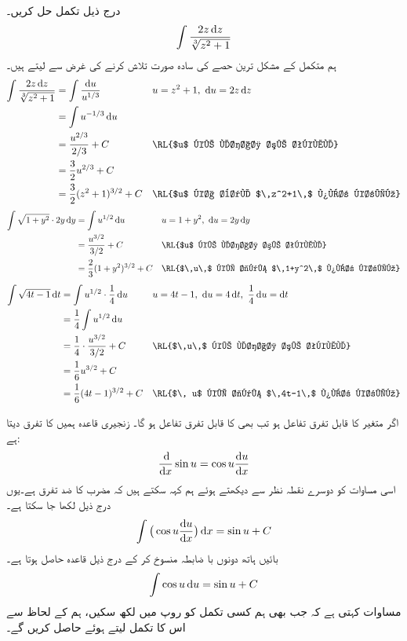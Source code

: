 درج ذیل تکمل حل کریں۔
\begin{align*}
\int\frac{2z\dif z}{\sqrt[3]{z^2+1}}
\end{align*}
ہم متکمل کے  مشکل ترین حصے کی سادہ صورت تلاش کرنے کی غرض سے   لیتے ہیں۔
\begin{align*}
\int\frac{2z\dif z}{\sqrt[3]{z^2+1}}&=\int\frac{\dif u}{u^{1/3}}&&u=z^2+1,\,\,\dif u=2z\dif z\\
&=\int u^{-1/3}\dif u\\
&=\frac{u^{2/3}}{2/3}+C&&\text{\RL{$u$ کے لحاظ سے تکمل}}\\
&=\frac{3}{2}u^{2/3}+C\\
&=\frac{3}{2}(z^2+1)^{3/2}+C&&\text{\RL{$u$ کا بدل $\,z^2+1\,$ پُر کریں}}
\end{align*}
\begin{align*}
\int\sqrt{1+y^2}\cdot 2y\dif y&=\int u^{1/2}\dif u&&u=1+y^2,\,\, \dif u=2y\dif y\\
&=\frac{u^{3/2}}{3/2}+C&&\text{\RL{$u$ کے لحاظ سے تکمل}}\\
&=\frac{2}{3}(1+y^2)^{3/2}+C&&\text{\RL{$\,u\,$ کی جگہ $\,1+y^2\,$ پُر کریں}}
\end{align*}
\begin{align*}
\int\sqrt{4t-1}\dif t&=\int u^{1/2}\cdot \frac{1}{4}\dif u&&u=4t-1,\,\,\dif u=4\dif t,\,\, \frac{1}{4}\dif u=\dif t\\
&=\frac{1}{4}\int u^{1/2}\dif u\\
&=\frac{1}{4}\cdot \frac{u^{3/2}}{3/2}+C&&\text{\RL{$\,u\,$ کے لحاظ سے تکمل}}\\
&=\frac{1}{6}u^{3/2}+C\\
&=\frac{1}{6}(4t-1)^{3/2}+C&&\text{\RL{$\, u$ کی جگہ $\,4t-1\,$ پُر کریں}}
\end{align*}

اگر  متغیر  کا قابل تفرق تفاعل ہو تب  بھی  کا قابل تفرق تفاعل ہو گا۔ زنجیری قاعدہ ہمیں  کا تفرق دیتا ہے:
\begin{align*}
\frac{\dif}{\dif x}\sin u=\cos u\frac{\dif u}{\dif x}
\end{align*}
اسی مساوات کو دوسرے نقطہ نظر سے دیکھتے ہوئے ہم کہہ سکتے ہیں کہ  مضرب  کا ضد تفرق ہے۔یوں درج ذیل لکھا جا سکتا ہے۔
\begin{align*}
\int\big(\cos u\frac{\dif u}{\dif x}\big)\dif x=\sin u+C
\end{align*}
بائیں ہاتھ دونوں   با ضابطہ  منسوخ  کر  کے درج ذیل قاعدہ حاصل ہوتا ہے۔
  \begin{align}\label{مساوات_تکمل_کوسائن_قاعدہ}
\int\cos u\dif u=\sin u+C
\end{align}
مساوات  کہتی ہے کہ جب بھی ہم کسی تکمل کو  روپ میں لکھ سکیں، ہم  کے لحاظ سے اس کا تکمل لیتے ہوئے  حاصل کریں گے۔

